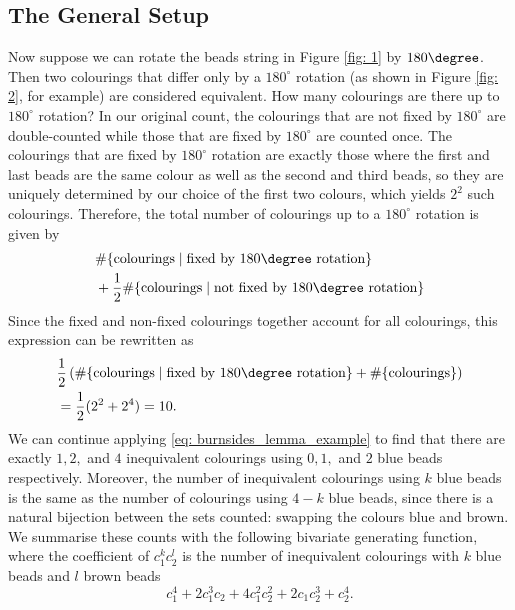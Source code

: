 \documentclass[a4paper,11pt]{article}
\numberwithin{equation}{section}
\begin{document}
    \subsection{The General Setup} Now suppose we can rotate the beads string in Figure \ref{fig: 1} by $180 \degree$. Then two colourings that differ only by a \(180^\circ\) rotation (as shown in Figure \ref{fig: 2}, for example) are considered equivalent. How many colourings are there up to $180^\circ$ rotation? In our original count, the colourings that are not fixed by \(180^\circ\) are double-counted while those that are fixed by \(180^\circ\) are counted once. The colourings that are fixed by \(180^\circ\) rotation are exactly those where the first and last beads are the same colour as well as the second and third beads, so they are uniquely determined by our choice of the first two colours, which yields \(2^2\) such colourings. Therefore, the total number of colourings up to a \(180^\circ\) rotation is given by\begin{align*}
        &\#\{ \text{colourings} \mid  \text{fixed by $180 \degree$ rotation} \}   \\
        &+ \frac{1}{2} \# \{ \text{colourings} \mid  \text{not fixed by $180 \degree$ rotation} \}   
    \end{align*} Since the fixed and non-fixed colourings together account for all colourings, this expression can be rewritten as \begin{align}
         &\frac{1}{2} \left ( \#\{ \text{colourings} \mid  \text{fixed by $180 \degree$ rotation} \}+ \# \{ \text{colourings}  \} \right) \label{eq: burnsides_lemma_example} \\
        &= \frac{1}{2} (2^2 + 2^4)=10. \nonumber 
    \end{align}
    We can continue applying \eqref{eq: burnsides_lemma_example} to find that there are exactly $1, 2,$ and $4$ inequivalent colourings using $0, 1,$ and $2$ blue beads respectively. Moreover, the number of inequivalent colourings using $k$ blue beads is the same as the number of colourings using $4-k$ blue beads, since there is a natural bijection between the sets counted: swapping the colours blue and brown. We summarise these counts with the following bivariate generating function, where the coefficient of $c_{1}^k c_{2}^{l}$ is the number of inequivalent colourings with $k$ blue beads and $l$ brown beads 
    \begin{equation} 
    \label{eq: example-pattern_inventory}
        c_{1}^4 + 2c_{1}^3c_{2} + 4c_{1}^{2}c_{2}^{2} + 2c_{1}c_{2}^3 + c_{2}^4. 
    \end{equation}\smallskip
    
\end{document}

